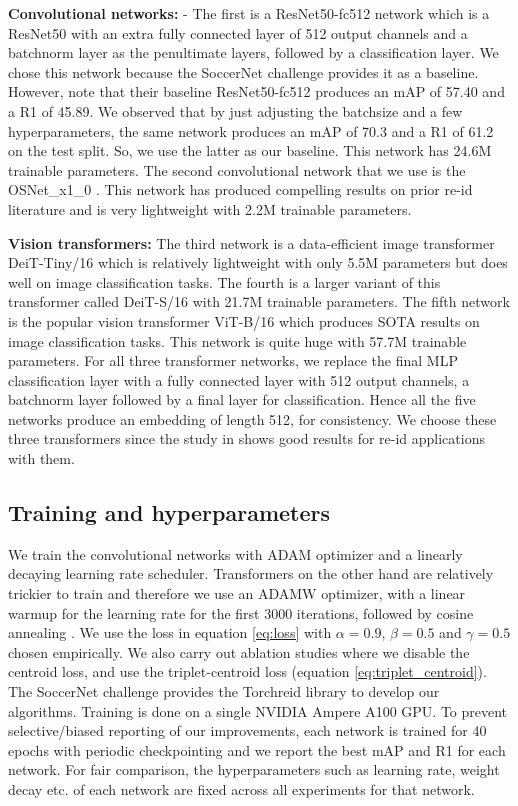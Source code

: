 \documentclass{article}
\begin{document}
\textbf{Convolutional networks:} - The first is a ResNet50-fc512 network which is a ResNet50 \cite{he2016deep} with an extra fully connected layer of 512 output channels and a batchnorm layer as the penultimate layers, followed by a classification layer. We chose this network because the SoccerNet challenge provides it as a baseline. However, note that their baseline ResNet50-fc512 produces an mAP of 57.40 and a R1 of 45.89. We observed that by just adjusting the batchsize and a few hyperparameters, the same network produces an mAP of 70.3 and a R1 of 61.2 on the test split. So, we use the latter as our baseline. This network has 24.6M trainable parameters. The second convolutional network that we use is the OSNet\_x1\_0 \cite{zhou2019omni,zhou2021learning}. This network has produced compelling results on prior re-id literature and is very lightweight with 2.2M trainable parameters.

\textbf{Vision transformers:} The third network is a data-efficient image transformer DeiT-Tiny/16 \cite{touvron2021training} which is relatively lightweight with only 5.5M parameters but does well on image classification tasks. The fourth is a larger variant of this transformer called DeiT-S/16 \cite{touvron2021training} with 21.7M trainable parameters. The fifth network is the popular vision transformer ViT-B/16 \cite{dosovitskiy2020image} which produces SOTA results on image classification tasks. This network is quite huge with 57.7M trainable parameters. For all three transformer networks, we replace the final MLP classification layer with a fully connected layer with 512 output channels, a batchnorm layer followed by a final layer for classification. Hence all the five networks produce an embedding of length 512, for consistency. We choose these three transformers since the study in \cite{he2021transreid} shows good results for re-id applications with them.

\subsection{Training and hyperparameters}

We train the convolutional networks with ADAM \cite{kingma2014adam} optimizer and a linearly decaying learning rate scheduler. Transformers on the other hand are relatively trickier to train and therefore we use an ADAMW \cite{adamw} optimizer, with a linear warmup for the learning rate for the first 3000 iterations, followed by cosine annealing \cite{loshchilov2016sgdr}. We use the loss in equation \ref{eq:loss} with $\alpha = 0.9$, $\beta = 0.5$ and $\gamma = 0.5$ chosen empirically. We also carry out ablation studies where we disable the centroid loss, and use the triplet-centroid loss (equation \ref{eq:triplet_centroid}). The SoccerNet challenge provides the Torchreid \cite{zhou2019torchreid} library to develop our algorithms. Training is done on a single NVIDIA Ampere A100 GPU. To prevent selective/biased reporting of our improvements, each network is trained for 40 epochs with periodic checkpointing and we report the best mAP and R1 for each network. For fair comparison, the hyperparameters such as learning rate, weight decay etc. of each network are fixed across all experiments for that network.
\end{document}
